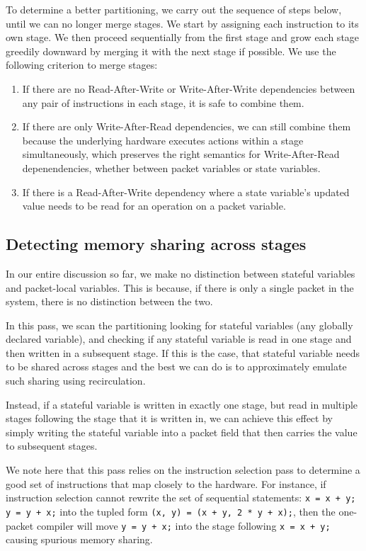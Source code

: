 To determine a better partitioning, we carry out the sequence of steps below,
until we can no longer merge stages. We start by assigning each instruction to
its own stage. We then proceed sequentially from the first stage and grow each
stage greedily downward by merging it with the next stage if possible. We use
the following criterion to merge stages:
\begin{enumerate}
\item If there are no Read-After-Write or Write-After-Write dependencies
between any pair of instructions in each stage, it is safe to combine them.
\item If there are only Write-After-Read dependencies, we can still combine
them because the underlying hardware executes actions within a stage
simultaneously, which preserves the right semantics for Write-After-Read
depenendencies, whether between packet variables or state variables.
\item If there is a Read-After-Write dependency where a state variable's
updated value needs to be read for an operation on a packet variable.
\end{enumerate}

\subsection{Detecting memory sharing across stages}
In our entire discussion so far, we make no distinction between stateful
variables and packet-local variables. This is because, if there is only a
single packet in the system, there is no distinction between the two.

In this pass, we scan the partitioning looking for stateful variables (any
globally declared variable), and checking if any stateful variable is read in
one stage and then written in a subsequent stage. If this is the case, that
stateful variable needs to be shared across stages and the best we can do is to
approximately emulate such sharing using recirculation.

Instead, if a stateful variable is written in exactly one stage, but read in
multiple stages following the stage that it is written in, we can achieve this
effect by simply writing the stateful variable into a packet field that then
carries the value to subsequent stages.

We note here that this pass relies on the instruction selection pass to
determine a good set of instructions that map closely to the hardware. For
instance, if instruction selection cannot rewrite the set of sequential
statements: \texttt{x = x + y; y = y + x;} into the tupled form \texttt{(x, y)
= (x + y, 2 * y + x);}, then the one-packet compiler will move \texttt{y = y +
x;} into the stage following \texttt{x = x + y;} causing spurious memory
sharing.

